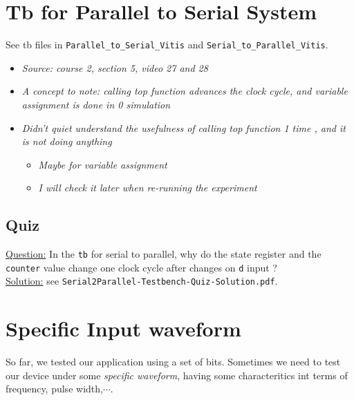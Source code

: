 \newpage
\section{Tb for Parallel to Serial System}

See tb files in \verb|Parallel_to_Serial_Vitis| and \verb|Serial_to_Parallel_Vitis|.

 

\begin{itemize}

\item \textit{Source: course 2, section 5, video 27 and 28}

\item \textit{A concept to note: calling top function advances the clock cycle, and variable assignment is done in 0 simulation}

\item \textit{Didn't quiet understand the usefulness of calling top function 1 time , and it is not doing anything}

	\begin{itemize}
	\item \textit{Maybe for variable assignment}
	
	\item \textit{I will check it later when re-running the experiment}
	\end{itemize}


\end{itemize}

\subsection{Quiz} 

\underline{Question:} In the \verb|tb| for serial to parallel, why do the state register and the \verb|counter| value change one clock cycle after changes on \verb|d| input ?\\

\underline{Solution:} see \verb|Serial2Parallel-Testbench-Quiz-Solution.pdf|.

\newpage
\section{Specific Input waveform}

So far, we tested our application using a set of bits.
Sometimes we need to test our device under some \textit{specific waveform}, having some characteritics int terms of frequency, pulse width,$\cdots$.\\


